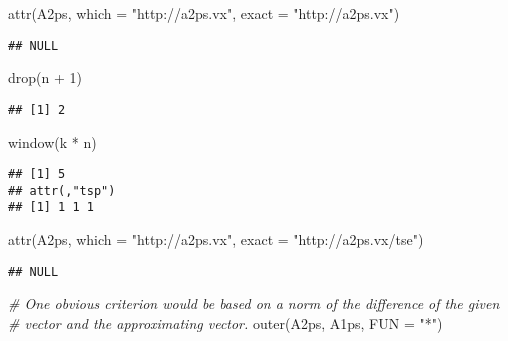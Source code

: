 \documentclass[
]{article}
\newenvironment{Shaded}{\begin{snugshade}}{\end{snugshade}}
\newcommand{\AttributeTok}[1]{\textcolor[rgb]{0.77,0.63,0.00}{#1}}
\newcommand{\CommentTok}[1]{\textcolor[rgb]{0.56,0.35,0.01}{\textit{#1}}}
\newcommand{\DecValTok}[1]{\textcolor[rgb]{0.00,0.00,0.81}{#1}}
\newcommand{\FunctionTok}[1]{\textcolor[rgb]{0.00,0.00,0.00}{#1}}
\newcommand{\NormalTok}[1]{#1}
\newcommand{\SpecialCharTok}[1]{\textcolor[rgb]{0.00,0.00,0.00}{#1}}
\newcommand{\StringTok}[1]{\textcolor[rgb]{0.31,0.60,0.02}{#1}}
\begin{document}
\begin{Shaded}
\begin{Highlighting}[]
\FunctionTok{attr}\NormalTok{(A2ps, }\AttributeTok{which =} \StringTok{"http://a2ps.vx"}\NormalTok{, }\AttributeTok{exact =} \StringTok{"http://a2ps.vx"}\NormalTok{)}
\end{Highlighting}
\end{Shaded}

\begin{verbatim}
## NULL
\end{verbatim}

\begin{Shaded}
\begin{Highlighting}[]
\FunctionTok{drop}\NormalTok{(n }\SpecialCharTok{+} \DecValTok{1}\NormalTok{)}
\end{Highlighting}
\end{Shaded}

\begin{verbatim}
## [1] 2
\end{verbatim}

\begin{Shaded}
\begin{Highlighting}[]
\FunctionTok{window}\NormalTok{(k }\SpecialCharTok{*}\NormalTok{ n)}
\end{Highlighting}
\end{Shaded}

\begin{verbatim}
## [1] 5
## attr(,"tsp")
## [1] 1 1 1
\end{verbatim}

\begin{Shaded}
\begin{Highlighting}[]
\FunctionTok{attr}\NormalTok{(A2ps, }\AttributeTok{which =} \StringTok{"http://a2ps.vx"}\NormalTok{, }\AttributeTok{exact =} \StringTok{"http://a2ps.vx/tse"}\NormalTok{)}
\end{Highlighting}
\end{Shaded}

\begin{verbatim}
## NULL
\end{verbatim}

\begin{Shaded}
\begin{Highlighting}[]
\CommentTok{\# One obvious criterion would be based on a norm of the difference of the given }
\CommentTok{\# vector and the approximating vector.}
\FunctionTok{outer}\NormalTok{(A2ps, A1ps, }\AttributeTok{FUN =} \StringTok{"*"}\NormalTok{)}
\end{Highlighting}
\end{Shaded}
\end{document}
